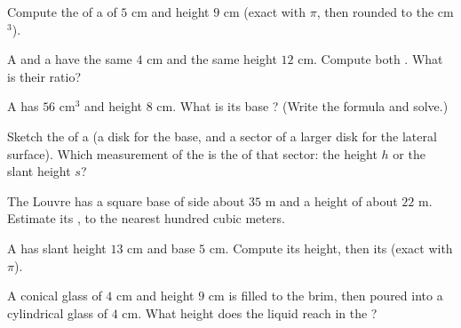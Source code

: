 \begin{exercise}[$\star$]\label{exo:g8:solids:3}
Compute the  of a  of  $5$ cm and height $9$ cm
(exact with $\pi$, then rounded to the cm$^3$).
\end{exercise}

\begin{exercise}[$\star$]\label{exo:g8:solids:4}
A  and a  have the same  $4$ cm and the same height
$12$ cm. Compute both . What is their ratio?
\end{exercise}

\begin{exercise}[$\star$]\label{exo:g8:solids:5}
A  has  $56$ cm$^3$ and height $8$ cm. What is its base
? (Write the  formula and solve.)
\end{exercise}

\begin{exercise}[$\star$]\label{exo:g8:solids:6}
Sketch the  of a  (a disk for the base, and a sector of a
larger disk for the lateral surface). Which measurement of the 
is the  of that sector: the height $h$ or the slant height
$s$?
\end{exercise}

\begin{exercise}[$\star\star$]\label{exo:g8:solids:7}
The Louvre  has a square base of side about $35$ m and a
height of about $22$ m. Estimate its , to the nearest hundred
cubic meters.
\end{exercise}

\begin{exercise}[$\star\star$]\label{exo:g8:solids:8}
A  has slant height $13$ cm and base  $5$ cm. Compute its
height, then its  (exact with $\pi$).
\end{exercise}

\begin{exercise}[$\star\star$]\label{exo:g8:solids:9}
A conical glass of  $4$ cm and height $9$ cm is filled to the
brim, then poured into a cylindrical glass of  $4$ cm. What
height does the liquid reach in the ?
\end{exercise}

